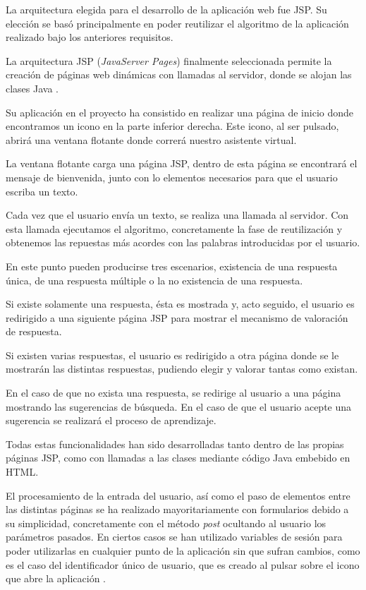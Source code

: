 La arquitectura elegida para el desarrollo de la aplicación web fue JSP. Su elección se basó principalmente en poder reutilizar el algoritmo de la aplicación realizado bajo los anteriores requisitos.

La arquitectura JSP (\emph{JavaServer Pages}) finalmente seleccionada permite la creación de páginas web dinámicas con llamadas al servidor, donde se alojan las clases Java \cite{jsp:wiki}.


Su aplicación en el proyecto ha consistido en realizar una página de inicio donde encontramos un icono en la parte inferior derecha. Este icono, al ser pulsado, abrirá una ventana flotante donde correrá nuestro asistente virtual.

La ventana flotante carga una página JSP, dentro de esta página se encontrará el mensaje de bienvenida, junto con lo elementos necesarios para que el usuario escriba un texto.

Cada vez que el usuario envía un texto, se realiza una llamada al servidor. Con esta llamada ejecutamos el algoritmo, concretamente la fase de reutilización y obtenemos las repuestas más acordes con las palabras introducidas por el usuario.


En este punto pueden producirse tres escenarios, existencia de una respuesta única, de una respuesta múltiple o la no existencia de una respuesta.

Si existe solamente una respuesta, ésta es mostrada y, acto seguido, el usuario es redirigido a una siguiente página JSP para mostrar el mecanismo de valoración de respuesta.

Si existen varias respuestas, el usuario es redirigido a otra página donde se le mostrarán las distintas respuestas, pudiendo elegir y valorar tantas como existan.

En el caso de que no exista una respuesta, se redirige al usuario a una página mostrando las sugerencias de búsqueda. En el caso de que el usuario acepte una sugerencia se realizará el proceso de aprendizaje.

Todas estas funcionalidades han sido desarrolladas tanto dentro de las propias páginas JSP, como con llamadas a las clases mediante código Java embebido en HTML.

El procesamiento de la entrada del usuario, así como el paso de elementos entre las distintas páginas se ha realizado mayoritariamente con formularios debido a su simplicidad, concretamente con el método \emph{post} ocultando al usuario los parámetros pasados. En ciertos casos se han utilizado variables de sesión para poder utilizarlas en cualquier punto de la aplicación sin que sufran cambios, como es el caso del identificador único de usuario, que es creado al pulsar sobre el icono que abre la aplicación \cite{jsp:form}.

